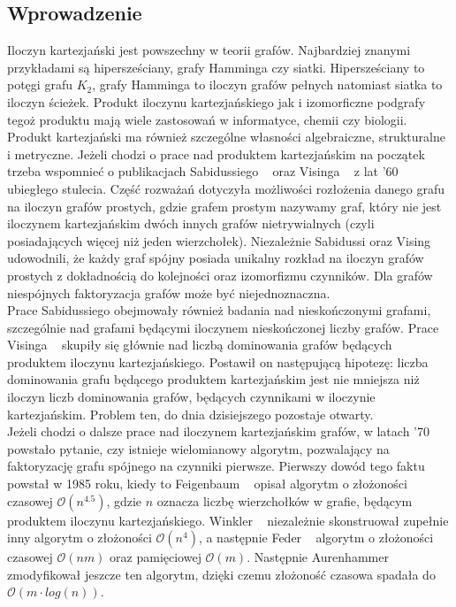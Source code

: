 \documentclass[12pt,a4paper,titlepage]{article}
\begin{document}
\subsection{Wprowadzenie}
Iloczyn kartezjański jest powszechny w teorii grafów. Najbardziej znanymi przykładami są hipersześciany, grafy Hamminga czy siatki. Hipersześciany to potęgi grafu $K_2$, grafy Hamminga to iloczyn grafów pełnych natomiast siatka to iloczyn ścieżek. Produkt iloczynu kartezjańskiego jak i izomorficzne podgrafy tegoż produktu mają wiele zastosowań w informatyce, chemii czy biologii.\\
Produkt kartezjański ma również szczególne własności algebraiczne, strukturalne i metryczne. Jeżeli chodzi o prace nad produktem kartezjańskim na początek trzeba wspomnieć o publikacjach Sabidussiego ~\cite{SAB} oraz Visinga ~\cite{VIS} z lat '60 ubiegłego stulecia. Część rozważań dotyczyła możliwości rozłożenia danego grafu na iloczyn grafów prostych, gdzie grafem prostym nazywamy graf, który nie jest iloczynem kartezjańskim dwóch innych grafów nietrywialnych (czyli posiadających więcej niż jeden wierzchołek). Niezależnie Sabidussi oraz Vising udowodnili, że każdy graf spójny posiada unikalny rozkład na iloczyn grafów prostych z dokładnością do kolejności oraz izomorfizmu czynników. Dla grafów niespójnych faktoryzacja grafów może być niejednoznaczna.\\
Prace Sabidussiego obejmowały również badania nad nieskończonymi grafami, szczególnie nad grafami będącymi iloczynem nieskończonej liczby grafów. Prace Visinga ~\cite{VIS2} skupiły się głównie nad liczbą dominowania grafów będących produktem iloczynu kartezjańskiego. Postawił on następującą hipotezę: liczba dominowania grafu będącego produktem kartezjańskim jest nie mniejsza niż iloczyn liczb dominowania grafów, będących czynnikami w iloczynie kartezjańskim. Problem ten, do dnia dzisiejszego pozostaje otwarty. \\
Jeżeli chodzi o dalsze prace nad iloczynem kartezjańskim grafów, w latach '70 powstało pytanie, czy istnieje wielomianowy algorytm, pozwalający na faktoryzację grafu spójnego na czynniki pierwsze. Pierwszy dowód tego faktu powstał w 1985 roku, kiedy to Feigenbaum ~\cite{FEI} opisał algorytm o złożoności czasowej $\mathcal{O} (n^{4.5})$, gdzie $n$ oznacza liczbę wierzchołków w grafie, będącym produktem iloczynu kartezjańskiego. Winkler ~\cite{WIN} niezależnie skonstruował zupełnie inny algorytm o złożoności $\mathcal{O} (n^{4})$, a następnie Feder ~\cite{FED} algorytm o złożoności czasowej $\mathcal{O} (nm)$ oraz pamięciowej $\mathcal{O} (m)$. Następnie Aurenhammer ~\cite{AUR} zmodyfikował jeszcze ten algorytm, dzięki czemu złożoność czasowa spadała do $\mathcal{O} (m\cdot log (n))$.\\
\end{document}
